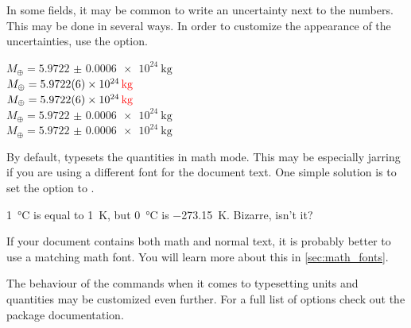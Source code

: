 In some fields, it may be common to write an uncertainty next to the numbers.
This may be done in several ways. In order to customize the appearance of the
uncertainties, use the  option.
\begin{example}
\(M_{\oplus} = \qty{
  5.9722(6) e24}{\kg}\)
  \\ %
\(M_{\oplus} = \qty{
  5.9722 +- 0.0006 e24}{\kg}\)
  \\ %
\(M_{\oplus} = \qty{
  5.9722 \pm 0.0006 e24}{\kg}\)
  \\ %
\(M_{\oplus} = \qty[
    uncertainty-mode = separate
  ]{5.9722(6) e24}{\kg}\)
  \\ %
\(M_{\oplus} = \qty[
  uncertainty-mode = full
]{5.9722(6) e24}{\kg}\)
\end{example}

By default,  typesets the quantities in math mode. This may be
especially jarring if you are using a different font for the document text. One
simple solution is to set the  option to .
\begin{example}
\setmainfont{Source Sans 3} %
\qty{1}{\degreeCelsius} is
equal to \qty{1}{\kelvin},
but \qty[
  mode = text,
]{0}{\degreeCelsius} is \qty[
  mode = text,
]{-273.15}{\kelvin}.
Bizarre, isn't it?
\end{example}
If your document contains both math and normal text, it is probably better to
use a matching math font. You will learn more about this in
\autoref{sec:math_fonts}.

The behaviour of the commands when it comes to typesetting units and quantities
may be customized even further. For a full list of options check out the
 package documentation.

